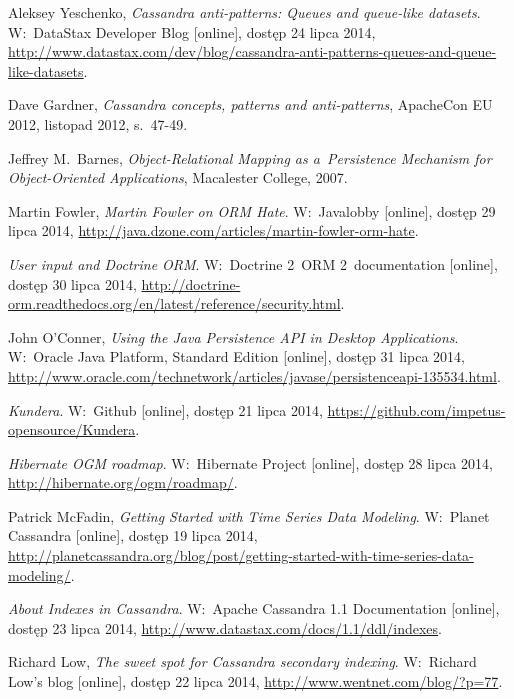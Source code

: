 \begin{thebibliography}{9}
Aleksey Yeschenko, \emph{Cassandra anti-patterns: Queues and queue-like datasets}. W:~DataStax Developer Blog [online], dostęp 24 lipca 2014, \url{http://www.datastax.com/dev/blog/cassandra-anti-patterns-queues-and-queue-like-datasets}.

Dave Gardner, \emph{Cassandra concepts, patterns and anti-patterns}, ApacheCon EU 2012, listopad 2012, s.~47-49.

Jeffrey M.~Barnes, \emph{Object-Relational Mapping as a~Persistence Mechanism for Object-Oriented Applications}, Macalester College, 2007.

Martin Fowler, \emph{Martin Fowler on ORM Hate}. W:~Javalobby [online], dostęp 29 lipca 2014, \linebreak \url{http://java.dzone.com/articles/martin-fowler-orm-hate}.

\emph{User input and Doctrine ORM}. W:~Doctrine 2~ORM 2~documentation [online], dostęp 30 lipca 2014, \url{http://doctrine-orm.readthedocs.org/en/latest/reference/security.html}.

John O'Conner, \emph{Using the Java Persistence API in Desktop Applications}. W:~Oracle Java Platform, Standard Edition [online], dostęp 31 lipca 2014, \url{http://www.oracle.com/technetwork/articles/javase/persistenceapi-135534.html}.

\emph{Kundera}. W:~Github [online], dostęp 21 lipca 2014, \linebreak \url{https://github.com/impetus-opensource/Kundera}.

\emph{Hibernate OGM roadmap}. W:~Hibernate Project [online], dostęp 28 lipca 2014, \url{http://hibernate.org/ogm/roadmap/}.

Patrick McFadin, \emph{Getting Started with Time Series Data Modeling}. W:~Planet Cassandra [online], dostęp 19 lipca 2014, \url{http://planetcassandra.org/blog/post/getting-started-with-time-series-data-modeling/}.

\emph{About Indexes in Cassandra}. W:~Apache Cassandra 1.1 Documentation [online], dostęp 23 lipca 2014, \linebreak \url{http://www.datastax.com/docs/1.1/ddl/indexes}.

Richard Low, \emph{The sweet spot for Cassandra secondary indexing}. W:~Richard Low's blog [online], dostęp 22 lipca 2014, \linebreak \url{http://www.wentnet.com/blog/?p=77}.


\end{thebibliography}
